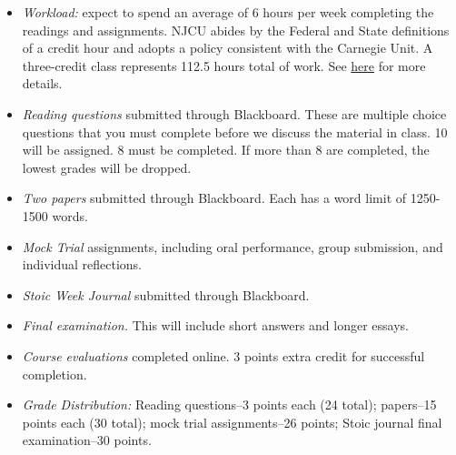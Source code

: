 \documentclass[article,oneside]{memoir}
\begin{document}
\begin{itemize}


\item \textit{Workload:} expect to spend an average of 6 hours per week completing the readings and assignments. NJCU abides by the Federal and State definitions of a credit hour and adopts a policy consistent with the Carnegie Unit. A three-credit class represents 112.5 hours total of work. See \href{http://scottoconnor.org/resources/Credit.pdf}{here} for more details.




\item \textit{Reading questions} submitted through Blackboard. These are multiple choice questions that you must complete before we discuss the material in class. 10 will be assigned. 8 must be completed. If more than 8 are completed, the lowest grades will be dropped. 



\item \textit{Two papers} submitted through Blackboard. Each has a word limit of 1250-1500 words. 

\item \textit{Mock Trial} assignments, including oral performance, group submission, and individual reflections. 

\item \textit{Stoic Week Journal} submitted through Blackboard.


\item \textit{Final examination.} This will include short answers and longer essays.  

\item \textit{Course evaluations} completed online. 3 points extra credit for successful completion.

\item \textit{Grade Distribution:} Reading questions--3 points each (24 total); papers--15 points each (30 total); mock trial assignments--26 points; Stoic journal final examination--30 points.




\end{itemize}
\end{document}
